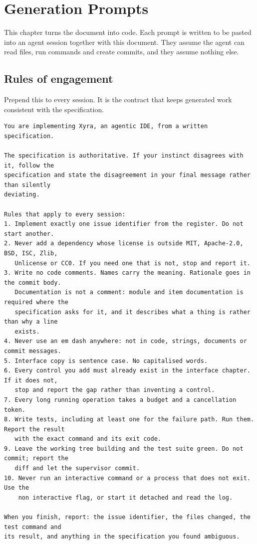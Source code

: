 \chapter{Generation Prompts}
\label{ch:prompts}

This chapter turns the document into code. Each prompt is written to be pasted into an agent
session together with this document. They assume the agent can read files, run commands and
create commits, and they assume nothing else.

\section{Rules of engagement}

Prepend this to every session. It is the contract that keeps generated work consistent with
the specification.

\begin{lstlisting}
You are implementing Xyra, an agentic IDE, from a written specification.

The specification is authoritative. If your instinct disagrees with it, follow the
specification and state the disagreement in your final message rather than silently
deviating.

Rules that apply to every session:
1. Implement exactly one issue identifier from the register. Do not start another.
2. Never add a dependency whose license is outside MIT, Apache-2.0, BSD, ISC, Zlib,
   Unlicense or CC0. If you need one that is not, stop and report it.
3. Write no code comments. Names carry the meaning. Rationale goes in the commit body.
   Documentation is not a comment: module and item documentation is required where the
   specification asks for it, and it describes what a thing is rather than why a line
   exists.
4. Never use an em dash anywhere: not in code, strings, documents or commit messages.
5. Interface copy is sentence case. No capitalised words.
6. Every control you add must already exist in the interface chapter. If it does not,
   stop and report the gap rather than inventing a control.
7. Every long running operation takes a budget and a cancellation token.
8. Write tests, including at least one for the failure path. Run them. Report the result
   with the exact command and its exit code.
9. Leave the working tree building and the test suite green. Do not commit; report the
   diff and let the supervisor commit.
10. Never run an interactive command or a process that does not exit. Use the
    non interactive flag, or start it detached and read the log.

When you finish, report: the issue identifier, the files changed, the test command and
its result, and anything in the specification you found ambiguous.
\end{lstlisting}

